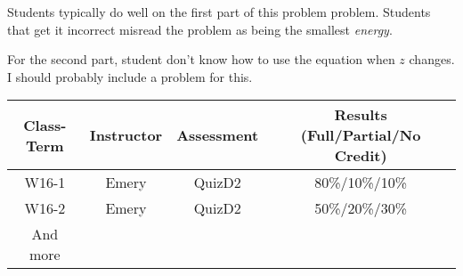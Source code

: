 \begin{outcomes}

Students typically do well on the first part of this problem problem. Students that get it incorrect misread the problem as being the smallest \emph{energy}.

For the second part, student don't know how to use the equation when $z$ changes. I should probably include a problem for this.

	\begin{center}
		\begin{tabular}{cccc}
			\hline\hline
                Class-Term & Instructor & Assessment & Results (Full/Partial/No Credit) \\
			\hline
                W16-1 & Emery & QuizD2 & 80\%/10\%/10\%\\
                W16-2 & Emery & QuizD2 & 50\%/20\%/30\%\\
			And more\\
			\hline
		\end{tabular}
	\end{center}
\end{outcomes}

\begin{comments}

\end{comments}